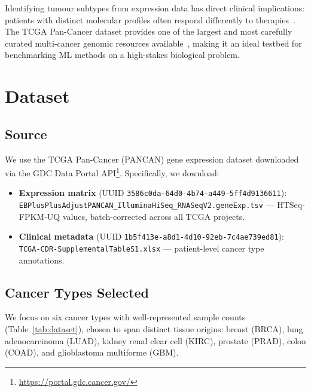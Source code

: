 \documentclass[11pt,letterpaper]{article}
\begin{document}
Identifying tumour subtypes from expression data has direct clinical
implications: patients with distinct molecular profiles often respond
differently to therapies~\cite{weinstein2013}.  The TCGA Pan-Cancer dataset
provides one of the largest and most carefully curated multi-cancer genomic
resources available~\cite{hutter2018}, making it an ideal testbed for
benchmarking ML methods on a high-stakes biological problem.

\section{Dataset}
\label{sec:dataset}

\subsection{Source}

We use the TCGA Pan-Cancer (PANCAN) gene expression dataset downloaded via the
GDC Data Portal API\footnote{\url{https://portal.gdc.cancer.gov/}}.
Specifically, we download:

\begin{itemize}[leftmargin=2em,itemsep=1pt]
  \item \textbf{Expression matrix} (UUID
        \texttt{3586c0da-64d0-4b74-a449-5ff4d9136611}):
        \texttt{EBPlusPlusAdjustPANCAN\_IlluminaHiSeq\_RNASeqV2.geneExp.tsv}
        --- HTSeq-FPKM-UQ values, batch-corrected across all TCGA projects.
  \item \textbf{Clinical metadata} (UUID
        \texttt{1b5f413e-a8d1-4d10-92eb-7c4ae739ed81}):
        \texttt{TCGA-CDR-SupplementalTableS1.xlsx} --- patient-level cancer type
        annotations.
\end{itemize}

\subsection{Cancer Types Selected}

We focus on six cancer types with well-represented sample counts
(Table~\ref{tab:dataset}), chosen to span distinct tissue origins:
breast (BRCA), lung adenocarcinoma (LUAD), kidney renal clear cell (KIRC),
prostate (PRAD), colon (COAD), and glioblastoma multiforme (GBM).
\end{document}
